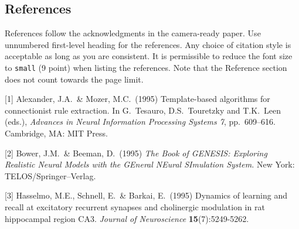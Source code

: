 \documentclass{article}
\begin{document}
\begin{CJK}{UTF8}{gbsn}
\section*{References}


References follow the acknowledgments in the camera-ready paper. Use unnumbered first-level heading for
the references. Any choice of citation style is acceptable as long as you are
consistent. It is permissible to reduce the font size to \verb+small+ (9 point)
when listing the references.
Note that the Reference section does not count towards the page limit.
\medskip


{
\small


[1] Alexander, J.A.\ \& Mozer, M.C.\ (1995) Template-based algorithms for
connectionist rule extraction. In G.\ Tesauro, D.S.\ Touretzky and T.K.\ Leen
(eds.), {\it Advances in Neural Information Processing Systems 7},
pp.\ 609--616. Cambridge, MA: MIT Press.


[2] Bower, J.M.\ \& Beeman, D.\ (1995) {\it The Book of GENESIS: Exploring
  Realistic Neural Models with the GEneral NEural SImulation System.}  New York:
TELOS/Springer--Verlag.


[3] Hasselmo, M.E., Schnell, E.\ \& Barkai, E.\ (1995) Dynamics of learning and
recall at excitatory recurrent synapses and cholinergic modulation in rat
hippocampal region CA3. {\it Journal of Neuroscience} {\bf 15}(7):5249-5262.
}



\end{CJK}
\end{document}
